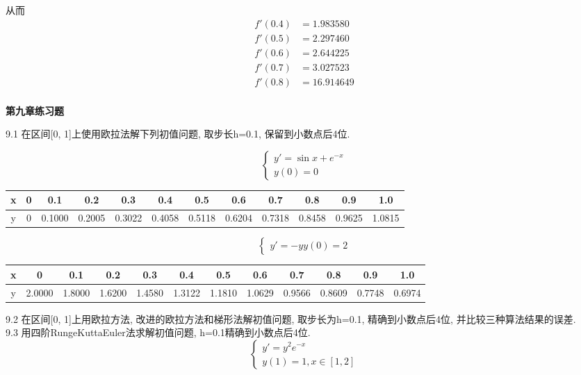 \documentclass[a4paper, 10pt]{article}
\begin{document}
\begin{CJK}{UTF8}{gbsn}
从而 \\

\begin{align*}
	f'(0.4) & =  1.983580 \\
	f'(0.5) & =  2.297460 \\
	f'(0.6) & =  2.644225 \\
	f'(0.7) & =  3.027523 \\
	f'(0.8) & = 16.914649 \\
\end{align*}

\textbf{第九章练习题}

9.1
在区间[0, 1]上使用欧拉法解下列初值问题, 取步长h=0.1, 保留到小数点后4位.

\begin{equation*}
	\begin{cases}
		y' = \sin{x}+e^{-x} \\
		y(0) = 0
	\end{cases}
\end{equation*}
\begin{tabular}{c|c c c c c c c c c c c}
\centering
\hline
x & 0 & 0.1 & 0.2 & 0.3 & 0.4 & 0.5 & 0.6 & 0.7 & 0.8 & 0.9 & 1.0 \\
\hline
y & 0 & 0.1000 & 0.2005 & 0.3022 & 0.4058 & 0.5118 & 0.6204 & 0.7318 & 0.8458 & 0.9625 & 1.0815 \\
\hline
\end{tabular}
\begin{equation*}
	\begin{cases}
		y' = -y
		y(0) = 2
	\end{cases}
\end{equation*}
\begin{tabular}{c|c c c c c c c c c c c}
\hline
x & 0 & 0.1 & 0.2 & 0.3 & 0.4 & 0.5 & 0.6 & 0.7 & 0.8 & 0.9 & 1.0 \\
\hline
y & 2.0000 & 1.8000 & 1.6200 & 1.4580 & 1.3122 & 1.1810 & 1.0629 & 0.9566 & 0.8609 & 0.7748 & 0.6974 \\
\hline
\end{tabular}

9.2
在区间[0, 1]上用欧拉方法, 改进的欧拉方法和梯形法解初值问题, 取步长为h=0.1, 精确到小数点后4位, 并比较三种算法结果的误差. \\

9.3
用四阶RungeKuttaEuler法求解初值问题, h=0.1精确到小数点后4位. \\
\begin{equation*}
	\begin{cases}
		y' = y^{2}e^{-x} \\
		y(1) = 1, x\in[1,2]
	\end{cases}
\end{equation*}


\end{CJK}
\end{document}
